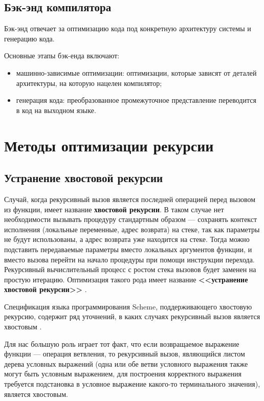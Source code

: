 \subsection{Бэк-энд компилятора}\label{sec:ch1/sec5/subsec6}

Бэк-энд отвечает за оптимизацию кода под конкретную архитектуру системы
и генерацию кода. 

Основные этапы бэк-енда включают: 

\begin{itemize}
    \item машинно-зависимые оптимизации:
    оптимизации, которые зависят от деталей архитектуры, 
    на которую нацелен компилятор;
    \item генерация кода:
    преобразованное промежуточное представление переводится в код
    на выходном языке. \cite[с.~619]{dragonbook}
\end{itemize}

\section{Методы оптимизации рекурсии}\label{sec:ch1/sec7}

\subsection{Устранение хвостовой рекурсии}\label{sec:ch1/sec7/subsec1}

Случай, когда рекурсивный вызов является последней операцией перед
вызовом из функции, имеет название \textbf{хвостовой рекурсии}.
В таком случае нет необходимости вызывать процедуру стандартным образом
--- сохранять контекст исполнения (локальные переменные, адрес возврата)
на стеке, так как параметры не будут использованы, а адрес возврата
уже находится на стеке. Тогда можно подставить передаваемые параметры
вместо локальных аргументов функции, и вместо вызова перейти на начало
процедуры при помощи инструкции перехода. Рекурсивный вычислительный
процесс с ростом стека вызовов будет заменен на простую итерацию.
Оптимизация такого рода имеет название \textbf{<<устранение хвостовой
рекурсии>>} \cite[с.~508]{sicp}.

Спецификация языка программирования Scheme, поддерживающего
хвостовую рекурсию, содержит ряд уточнений, в каких случаях рекурсивный
вызов является хвостовым \cite[с.~59]{r6rs}.

Для нас большую роль играет тот факт, что если возвращаемое
выражение функции --- операция ветвления, то рекурсивный вызов,
являющийся листом дерева условных выражений
(одна или обе ветви условного выражения также могут быть условным
выражением, для построения корректного выражения требуется
подстановка в условное выражение какого-то терминального значения),
является хвостовым.

